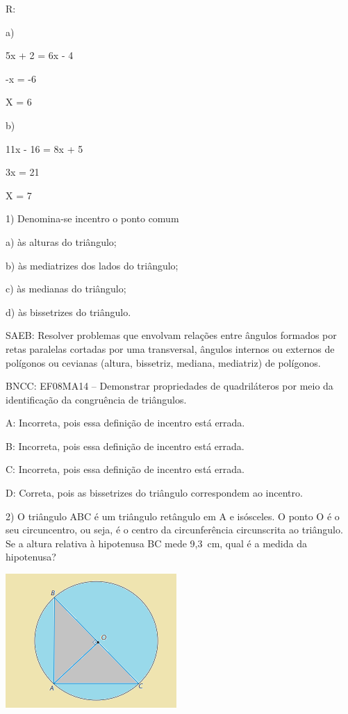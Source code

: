 R:

a)

5x + 2 = 6x - 4

-x = -6

X = 6

b)

11x - 16 = 8x + 5

3x = 21

X = 7


1) Denomina-se incentro o ponto comum

a) às alturas do triângulo;

b) às mediatrizes dos lados do triângulo;

c) às medianas do triângulo;

d) às bissetrizes do triângulo.

SAEB: Resolver problemas que envolvam relações entre ângulos formados
por retas paralelas cortadas por uma transversal, ângulos internos ou
externos de polígonos ou cevianas (altura, bissetriz, mediana,
mediatriz) de polígonos.

BNCC: EF08MA14 -- Demonstrar propriedades de quadriláteros por meio da
identificação da congruência de triângulos.

A: Incorreta, pois essa definição de incentro está errada.

B: Incorreta, pois essa definição de incentro está errada.

C: Incorreta, pois essa definição de incentro está errada.

D: Correta, pois as bissetrizes do triângulo correspondem ao incentro.

2) O triângulo ABC é um triângulo retângulo em A e isósceles. O ponto O
é o seu circuncentro, ou seja, é o centro da circunferência circunscrita
ao triângulo. Se a altura relativa à hipotenusa BC mede 9,3~cm, qual é a
medida da hipotenusa?

\includegraphics[width=2.5625in,height=2.02083in]{./imgSAEB_8_MAT/media/image35.png}

